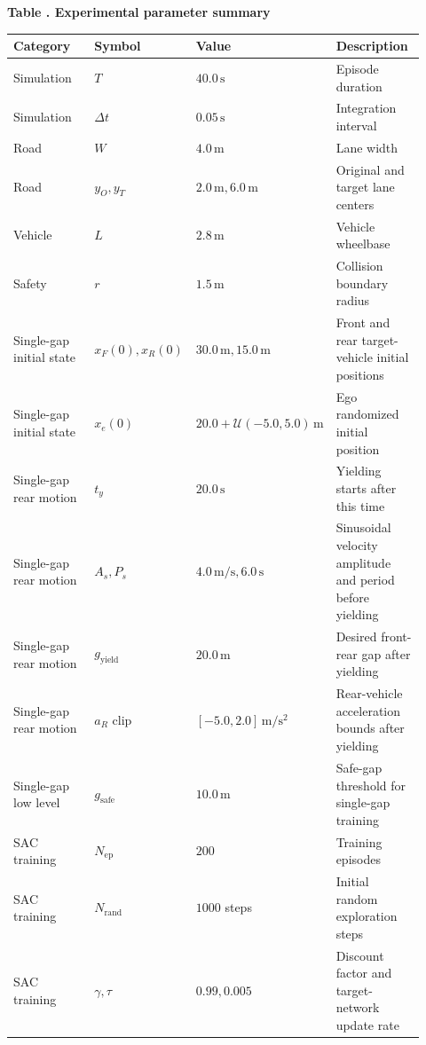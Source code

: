 \begin{uomappendix}
{\scriptsize\setlength{\parskip}{0pt}\setlength{\tabcolsep}{2pt}
\begin{center}
\label{tab:experimental-parameter-summary}
\small\textbf{Table \thetable. Experimental parameter summary}
\end{center}
\begin{supertabular}{L{0.23\linewidth}L{0.23\linewidth}L{0.23\linewidth}L{0.23\linewidth}}
\toprule
Category & Symbol & Value & Description \\
\midrule
Simulation & \(T\) & \(40.0\,\mathrm{s}\) & Episode duration \\
Simulation & \(\Delta t\) & \(0.05\,\mathrm{s}\) & Integration interval \\
Road & \(W\) & \(4.0\,\mathrm{m}\) & Lane width \\
Road & \(y_O,y_T\) & \(2.0\,\mathrm{m},6.0\,\mathrm{m}\) & Original and target lane centers \\
Vehicle & \(L\) & \(2.8\,\mathrm{m}\) & Vehicle wheelbase \\
Safety & \(r\) & \(1.5\,\mathrm{m}\) & Collision boundary radius \\
Single-gap initial state & \(x_F(0),x_R(0)\) & \(30.0\,\mathrm{m},15.0\,\mathrm{m}\) & Front and rear target-vehicle initial positions \\
Single-gap initial state & \(x_e(0)\) & \(20.0+\mathcal{U}(-5.0,5.0)\,\mathrm{m}\) & Ego randomized initial position \\
Single-gap rear motion & \(t_y\) & \(20.0\,\mathrm{s}\) & Yielding starts after this time \\
Single-gap rear motion & \(A_s,P_s\) & \(4.0\,\mathrm{m / s},6.0\,\mathrm{s}\) & Sinusoidal velocity amplitude and period before yielding \\
Single-gap rear motion & \(g_{\mathrm{yield}}\) & \(20.0\,\mathrm{m}\) & Desired front-rear gap after yielding \\
Single-gap rear motion & \(a_R\) clip & \([-5.0,2.0]\,\mathrm{m / s^2}\) & Rear-vehicle acceleration bounds after yielding \\
Single-gap low level & \(g_{\mathrm{safe}}\) & \(10.0\,\mathrm{m}\) & Safe-gap threshold for single-gap training \\
SAC training & \(N_{\mathrm{ep}}\) & \(200\) & Training episodes \\
SAC training & \(N_{\mathrm{rand}}\) & \(1000\) steps & Initial random exploration steps \\
SAC training & \(\gamma,\tau\) & \(0.99,0.005\) & Discount factor and target-network update rate \\

\end{supertabular}}
\end{uomappendix}
